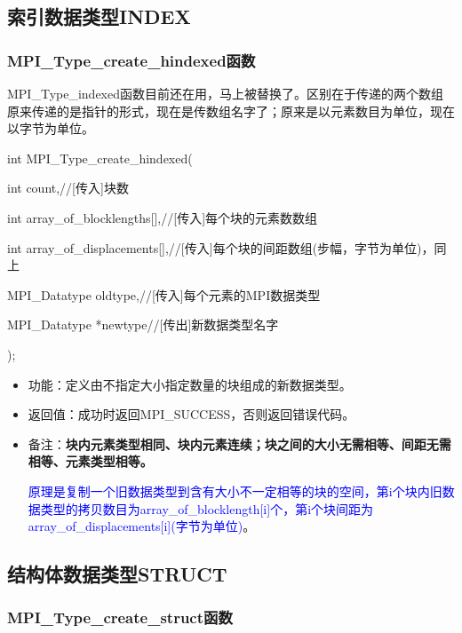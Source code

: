 \documentclass[UTF8]{article}%
\begin{document}
\subsection{索引数据类型INDEX}

\subsubsection{MPI\_Type\_create\_hindexed函数}

MPI\_Type\_indexed函数目前还在用，马上被替换了。区别在于传递的两个数组原来传递的是指针的形式，现在是传数组名字了；原来是以元素数目为单位，现在以字节为单位。

int MPI\_Type\_create\_hindexed(

    \qquad int             count,//[传入]块数

    \qquad int             array\_of\_blocklengths[],//[传入]每个块的元素数数组

    \qquad int             array\_of\_displacements[],//[传入]每个块的间距数组(步幅，字节为单位)，同上

    \qquad MPI\_Datatype   oldtype,//[传入]每个元素的MPI数据类型

    \qquad MPI\_Datatype   *newtype//[传出]新数据类型名字

);

\begin{itemize}
    \item 功能：定义由不指定大小指定数量的块组成的新数据类型。
    \item 返回值：成功时返回MPI\_SUCCESS，否则返回错误代码。
    \item 备注：\textbf{块内元素类型相同、块内元素连续；块之间的大小无需相等、间距无需相等、元素类型相等。}
    
    \textcolor{blue}{原理是复制一个旧数据类型到含有大小不一定相等的块的空间，第i个块内旧数据类型的拷贝数目为array\_of\_blocklength[i]个，第i个块间距为array\_of\_displacements[i](字节为单位)}。

\end{itemize}

\subsection{结构体数据类型STRUCT}

\subsubsection{MPI\_Type\_create\_struct函数}
\end{document}
